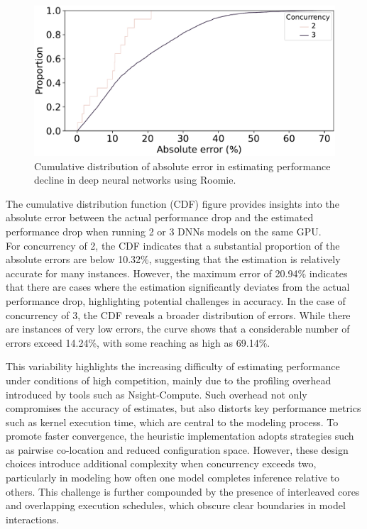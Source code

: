 \begin{figure}[t!]
	\centering
	\includegraphics[width=\linewidth]{chapters/roomie/images/absolute_error.pdf}
	\caption{Cumulative distribution of absolute error in estimating performance decline in deep neural networks using Roomie.}
	\label{fig:theoritical_achieved_occupancy}
\end{figure}

The cumulative distribution function (CDF) figure provides insights into the absolute error between the actual performance drop and the estimated performance drop when running 2 or 3 DNNs models on the same GPU.\\
For concurrency of 2, the CDF indicates that a substantial proportion of the absolute errors are below 10.32\%, suggesting that the estimation is relatively accurate for many instances. However, the maximum error of 20.94\% indicates that there are cases where the estimation significantly deviates from the actual performance drop, highlighting potential challenges in accuracy.
In the case of concurrency of 3, the CDF reveals a broader distribution of errors. While there are instances of very low errors, the curve shows that a considerable number of errors exceed 14.24\%, with some reaching as high as 69.14\%.

This variability highlights the increasing difficulty of estimating performance under conditions of high competition, mainly due to the profiling overhead introduced by tools such as Nsight-Compute. Such overhead not only compromises the accuracy of estimates, but also distorts key performance metrics such as kernel execution time, which are central to the modeling process. To promote faster convergence, the heuristic implementation adopts strategies such as pairwise co-location and reduced configuration space. However, these design choices introduce additional complexity when concurrency exceeds two, particularly in modeling how often one model completes inference relative to others. This challenge is further compounded by the presence of interleaved cores and overlapping execution schedules, which obscure clear boundaries in model interactions.

